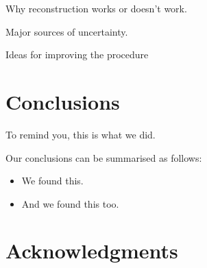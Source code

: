 \documentclass[useAMS,usenatbib]{mn2e}
\begin{document}
Why reconstruction works or doesn't work.

Major sources of uncertainty.

Ideas for improving the procedure



\section{Conclusions}
\label{sec:conclude}

To remind you, this is what we did.

Our conclusions can be summarised as follows:

\begin{itemize}

\item We found this.

\item And we found this too.

\end{itemize}







\section*{Acknowledgments}
 
\end{document}
